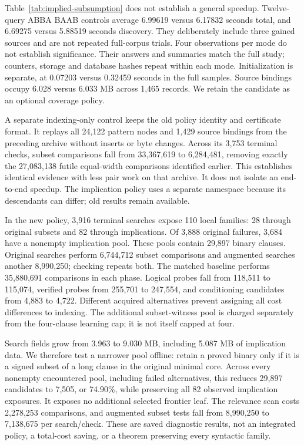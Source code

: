 \documentclass[11pt,a4paper]{article}
\numberwithin{equation}{section}
\theoremstyle{plain}
\theoremstyle{definition}
\theoremstyle{remark}
\begin{document}
Table~\ref{tab:implied-subsumption} does not establish a general speedup. Twelve-query ABBA BAAB controls average 6.99619 versus 6.17832 seconds total, and 6.69275 versus 5.88519 seconds discovery. They deliberately include three gained sources and are not repeated full-corpus trials. Four observations per mode do not establish significance. Their answers and summaries match the full study; counters, storage and database hashes repeat within each mode. Initialization is separate, at 0.07203 versus 0.32459 seconds in the full samples. Source bindings occupy 6.028 versus 6.033 MB across 1,465 records. We retain the candidate as an optional coverage policy.

A separate indexing-only control keeps the old policy identity and certificate format. It replays all 24,122 pattern nodes and 1,429 source bindings from the preceding archive without inserts or byte changes. Across its 3,753 terminal checks, subset comparisons fall from 33,367,619 to 6,284,481, removing exactly the 27,083,138 futile equal-width comparisons identified earlier. This establishes identical evidence with less pair work on that archive. It does not isolate an end-to-end speedup. The implication policy uses a separate namespace because its descendants can differ; old results remain available.

In the new policy, 3,916 terminal searches expose 110 local families: 28 through original subsets and 82 through implications. Of 3,888 original failures, 3,684 have a nonempty implication pool. These pools contain 29,897 binary clauses. Original searches perform 6,744,712 subset comparisons and augmented searches another 8,990,250; checking repeats both. The matched baseline performs 35,880,691 comparisons in each phase. Logical probes fall from 118,511 to 115,074, verified probes from 255,701 to 247,554, and conditioning candidates from 4,883 to 4,722. Different acquired alternatives prevent assigning all cost differences to indexing. The additional subset-witness pool is charged separately from the four-clause learning cap; it is not itself capped at four.

Search fields grow from 3.963 to 9.030 MB, including 5.087 MB of implication data. We therefore test a narrower pool offline: retain a proved binary only if it is a signed subset of a long clause in the original minimal core. Across every nonempty encountered pool, including failed alternatives, this reduces 29,897 candidates to 7,505, or 74.90\%, while preserving all 82 observed implication exposures. It exposes no additional selected frontier leaf. The relevance scan costs 2,278,253 comparisons, and augmented subset tests fall from 8,990,250 to 7,138,675 per search/check. These are saved diagnostic results, not an integrated policy, a total-cost saving, or a theorem preserving every syntactic family.
\end{document}
